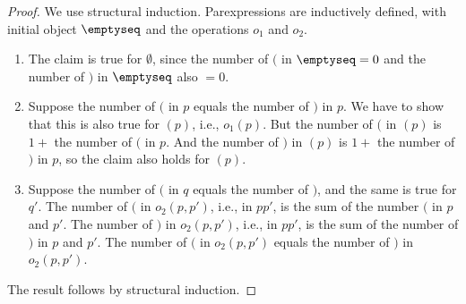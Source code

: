 \documentclass[../../../include/open-logic-section]{subfiles}
\begin{document}
\begin{proof}
We use structural induction.  Parexpressions are inductively defined,
with initial object $\emptyseq$ and the operations $o_1$ and $o_2$.
\begin{enumerate}
\item The claim is true for $\emptyset$, since the number of $($ in
  $\emptyseq = 0$ and the number of $)$ in $\emptyseq$ also $= 0$.
\item Suppose the number of $($ in $p$ equals the number of $)$ in
  $p$. We have to show that this is also true for $(p)$, i.e.,
  $o_1(p)$.  But the number of $($ in $(p)$ is $1 + {}$ the number of
  $($ in $p$.  And the number of $)$ in $(p)$ is $1 + {}$ the number
  of $)$ in $p$, so the claim also holds for $(p)$.
\item Suppose the number of $($ in $q$ equals the number of $)$, and
  the same is true for $q'$. The number of $($ in $o_2(p, p')$, i.e.,
  in $pp'$, is the sum of the number $($ in $p$ and $p'$. The number
  of $)$ in $o_2(p, p')$, i.e., in $pp'$, is the sum of the number of
  $)$ in $p$ and $p'$. The number of $($ in $o_2(p, p')$ equals the
  number of $)$ in $o_2(p,p')$.
\end{enumerate}
The result follows by structural induction.
\end{proof}
\end{document}
